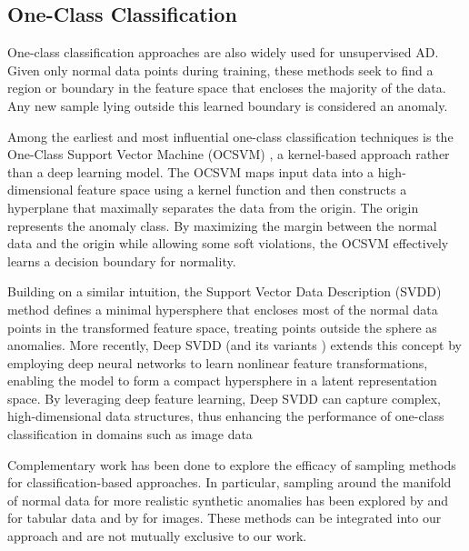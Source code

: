 \documentclass{article}
\begin{document}
\subsection{One-Class Classification}
One-class classification approaches are also widely used for unsupervised AD. Given only normal data points during training, these methods seek to find a region or boundary in the feature space that encloses the majority of the data. Any new sample lying outside this learned boundary is considered an anomaly. 


Among the earliest and most influential one-class classification techniques is the One-Class Support Vector Machine (OCSVM) \citep{ocsvm, chen2001one, manevitz2001one},  a kernel-based approach rather than a deep learning model. 
The OCSVM maps input data into a high-dimensional feature space using a kernel function and then constructs a hyperplane that maximally separates the data from the origin. The origin represents the anomaly class. By maximizing the margin between the normal data and the origin while allowing some soft violations, the OCSVM effectively learns a decision boundary for normality.

Building on a similar intuition, the Support Vector Data Description (SVDD) \citep{SVDD} method defines a minimal hypersphere that encloses most of the normal data points in the transformed feature space, treating points outside the sphere as anomalies. More recently, Deep SVDD \citep{deep_svdd} (and its variants \citep{dohsc_ad, DevNet_AD}) extends this concept by employing deep neural networks to learn nonlinear feature transformations, enabling the model to form a compact hypersphere in a latent representation space.
By leveraging deep feature learning, Deep SVDD can capture complex, high-dimensional data structures, thus enhancing the performance of one-class classification in domains such as image data \citep{yi2020patch}


Complementary work has been done to explore the efficacy of sampling methods for classification-based approaches.
In particular, sampling around the manifold of normal data for more realistic synthetic anomalies has been explored by \citet{min_vol_svm_davenport} and \citet{kdd_artificial_anom_wenke} for tabular data and by \citet{outlier_exposure} for images.
These methods can be integrated into our approach and are not mutually exclusive to our work.
\end{document}
